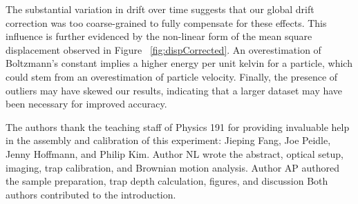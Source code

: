 \documentclass[aps,prb,twocolumn,superscriptaddress,floatfix,longbibliography,citeautoscript]{revtex4-2}
\begin{document}
The substantial variation in drift over time suggests that our global drift correction was too coarse-grained to fully compensate for these effects. This influence is further evidenced by the non-linear form of the mean square displacement observed in Figure ~\ref{fig:dispCorrected}. An overestimation of Boltzmann’s constant implies a higher energy per unit kelvin for a particle, which could stem from an overestimation of particle velocity. Finally, the presence of outliers may have skewed our results, indicating that a larger dataset may have been necessary for improved accuracy.

\begin{acknowledgments}
The authors thank the teaching staff of Physics 191 for providing invaluable help 
in the assembly and calibration of this experiment: 
Jieping Fang, Joe Peidle, Jenny Hoffmann, and Philip Kim. 
Author NL wrote the abstract, optical setup, imaging, trap calibration, and Brownian motion analysis. 
Author AP authored the sample preparation, trap depth calculation, figures, and discussion
Both authors contributed to the introduction. 

\end{acknowledgments}


\end{document}
